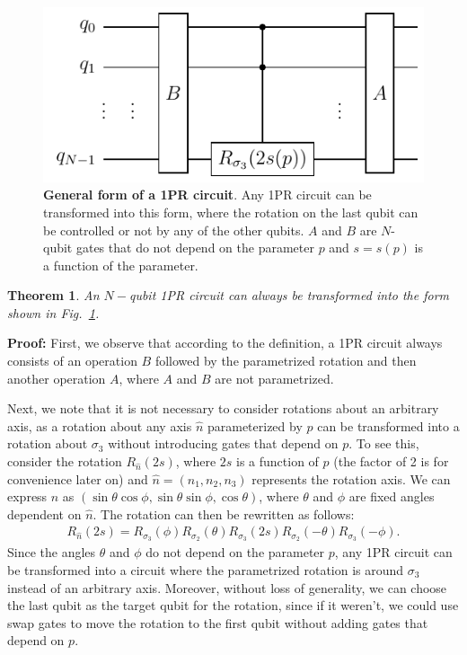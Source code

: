 \documentclass[10pt,letterpaper]{article} %
\newcommand{\fref}[1]{Fig.~\ref{#1}}
\newtheorem{theorem}{Theorem}
\begin{document}
\begin{figure} %
\centering
\includegraphics{images/OPR-circuit.pdf}
\caption{\textbf{General form of a 1PR circuit}.
Any 1PR circuit can be transformed into this form,
where the rotation on the last qubit
can be controlled or not by any of the other qubits.
$A$ and $B$
are $N$-qubit gates that do not depend on the parameter $p$ and
$s= s(p)$ is a function of the parameter.
}
\label{fig:1PR-circuit}
\end{figure} %

\begin{theorem}
An $N-$qubit 1PR circuit can always be transformed 
into the form shown in \fref{fig:1PR-circuit}.
\end{theorem}
\textbf{Proof:} 
First, we observe that according to the
definition, a 1PR circuit always consists of an operation $B$ followed 
by the parametrized rotation and then another operation $A$, 
where $A$ and $B$ are not parametrized.

Next, we note that it is not necessary to consider rotations about an arbitrary axis,
as a rotation about any axis $\hat{n}$ parameterized by $p$
can be transformed into a rotation about $\sigma_3$ without introducing 
gates that depend on $p$. To see this, consider the rotation $R_{\hat{n}}(2s)$, where $2s$ 
is a function of $p$ (the factor of 2 is for convenience later on) 
and $\hat{n} = (n_1,n_2,n_3)$ represents the rotation axis. 
We can express $\hat{n}$ as $(\sin \theta \cos \phi, \sin \theta \sin \phi, \cos \theta)$, 
where $\theta$ and $\phi$ are fixed angles dependent on $\hat{n}$. 
The rotation can then be rewritten as follows:
\begin{eqnarray}
R_{\hat{n}}(2s) = R_{\sigma_3}(\phi) R_{\sigma_2}(\theta) R_{\sigma_3}(2s) R_{\sigma_2}(-\theta) R_{\sigma_3}(-\phi).
\end{eqnarray}
Since the angles $\theta$ and $\phi$ do not depend on the parameter $p$,
any 1PR circuit can be transformed into a circuit where the parametrized
 rotation is around $\sigma_3$ instead of an arbitrary axis. 
Moreover, without loss of generality, we can choose the last qubit as the
target qubit for the rotation, since if it weren't, we could use
swap gates to move the rotation
to the first qubit without adding gates
that depend on $p$. 
\end{document}
